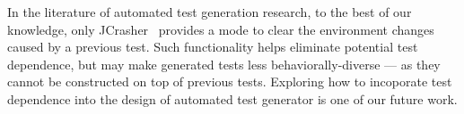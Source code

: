 In the literature of automated test generation research,
to the best of our knowledge, only JCrasher~\cite{Csallner:2004}
provides a mode to clear the environment changes caused
by a previous test. Such functionality helps eliminate
potential test dependence, but may make generated
tests less behaviorally-diverse --- as they cannot be constructed
on top of previous tests. Exploring how to
incoporate test dependence into the design of automated
test generator is one of our future work.






%













